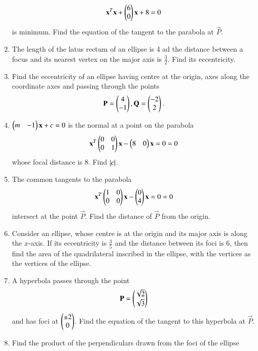 \documentclass[journal,12pt,twocolumn]{IEEEtran}
\begin{document}
\begin{enumerate}[label=\arabic*.]
\begin{equation}
\mathbf{x}^T\mathbf{x} +\begin{pmatrix}6 \\ 0 \end{pmatrix}\mathbf{x} + 8 = 0
\end{equation}
%
is minimum.  Find the equation of the tangent to the parabola at $\vec{P}$.
\item The length of the latus rectum of an ellipse is 4 ad the distance between a focus and its nearest
vertex on the major axis is $\frac{3}{2}$.  Find its eccentricity.
\item Find the eccentricity of an ellipse having centre at the origin, axes along the coordinate axes and 
passing through the points 
\begin{equation}
\mathbf{P} = \begin{pmatrix}4\\-1\end{pmatrix}, 
\mathbf{Q} = \begin{pmatrix}-2\\2\end{pmatrix}. 
\end{equation}
\item $\begin{pmatrix}m & -1\end{pmatrix}\mathbf{x} + c =0$ is the normal at a point on the parabola
\begin{equation}
\mathbf{x}^T\begin{pmatrix}0 & 0 \\ 0 & 1\end{pmatrix}\mathbf{x} -\begin{pmatrix}8 & 0 \end{pmatrix}\mathbf{x} = 0
 = 0
\end{equation}
%
whose focal distance is 8.  Find $\left\vert c\right\vert$.
\item The common tangents to the parabola
\begin{equation}
\mathbf{x}^T\begin{pmatrix}1 & 0 \\ 0 & 0\end{pmatrix}\mathbf{x} -\begin{pmatrix}0\\ 4 \end{pmatrix}\mathbf{x} = 0
 = 0
\end{equation}
%
intersect at the point $\vec{P}$.  Find the distance of $\vec{P}$ from the origin.
\item  Consider an ellipse, whose centre is at the origin and its major axis is along the $x$-axis.  If its 
eccentricity is $\frac{3}{5}$ and the distance between its foci is 6, then find the area of the quadrilateral 
inscribed in the ellipse,  with the vertices as the vertices of the ellipse.
\item A hyperbola passes through the point 
\begin{equation}
\mathbf{P}=\begin{pmatrix}\sqrt{2}\\ \sqrt{3}\end{pmatrix}
\end{equation}
and has foci at $\begin{pmatrix}\pm 2\\ 0\end{pmatrix}$.  Find the equation of the tangent to this hyperbola at 
$\vec{P}$.
\item Find the product of the perpendiculars drawn from the foci of the ellipse
\begin{equation}

\end{equation}
\end{enumerate}
\end{document}
